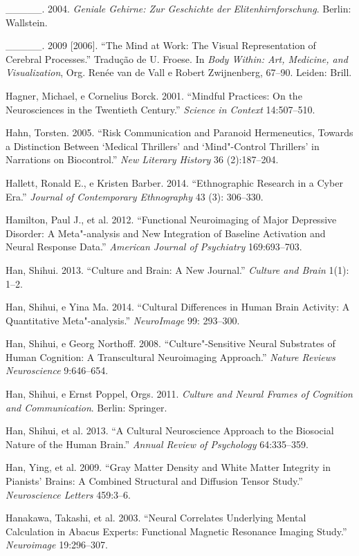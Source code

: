 {\begin{Parskip}
\_\_\_\_\_. 2004. \emph{Geniale Gehirne: Zur Geschichte der
Elitenhirnforschung}. Berlin: Wallstein.

\_\_\_\_\_. 2009 {[}2006{]}. ``The Mind at Work: The Visual
Representation of Cerebral Processes.'' Tradução de U. Froese. In
\emph{Body Within: Art, Medicine, and Visualization}, Org. Renée van de
Vall e Robert Zwijnenberg, 67--90. Leiden: Brill.

Hagner, Michael, e Cornelius Borck. 2001. ``Mindful Practices: On the
Neurosciences in the Twentieth Century.'' \emph{Science in Context}
14:507--510.

Hahn, Torsten. 2005. ``Risk Communication and Paranoid Hermeneutics,
Towards a Distinction Between `Medical Thrillers' and `Mind"-Control
Thrillers' in Narrations on Biocontrol.'' \emph{New Literary History} 36
(2):187--204.

Hallett, Ronald E., e Kristen Barber. 2014. ``Ethnographic Research in a
Cyber Era.'' \emph{Journal of Contemporary Ethnography} 43 (3):
306--330.

Hamilton, Paul J., et al. 2012. ``Functional Neuroimaging of Major
Depressive Disorder: A Meta"-analysis and New Integration of Baseline
Activation and Neural Response Data.'' \emph{American Journal of
Psychiatry} 169:693--703.

Han, Shihui. 2013. ``Culture and Brain: A New Journal.'' \emph{Culture
and Brain} 1(1): 1--2.

Han, Shihui, e Yina Ma. 2014. ``Cultural Differences in Human Brain
Activity: A Quantitative Meta"-analysis.'' \emph{NeuroImage} 99:
293--300.

Han, Shihui, e Georg Northoff. 2008. ``Culture"-Sensitive Neural
Substrates of Human Cognition: A Transcultural Neuroimaging Approach.''
\emph{Nature Reviews Neuroscience} 9:646--654.

Han, Shihui, e Ernst Poppel, Orgs. 2011. \emph{Culture and Neural Frames
of Cognition and Communication}. Berlin: Springer.

Han, Shihui, et al. 2013. ``A Cultural Neuroscience Approach to the
Biosocial Nature of the Human Brain.'' \emph{Annual Review of
Psychology} 64:335--359.

Han, Ying, et al. 2009. ``Gray Matter Density and White Matter Integrity
in Pianists' Brains: A Combined Structural and Diffusion Tensor 
Study.'' \emph{Neuroscience Letters} 459:3--6.

Hanakawa, Takashi, et al. 2003. ``Neural Correlates Underlying Mental
Calculation in Abacus Experts: Functional Magnetic Resonance Imaging
Study.'' \emph{Neuroimage} 19:296--307.


\end{Parskip}}
